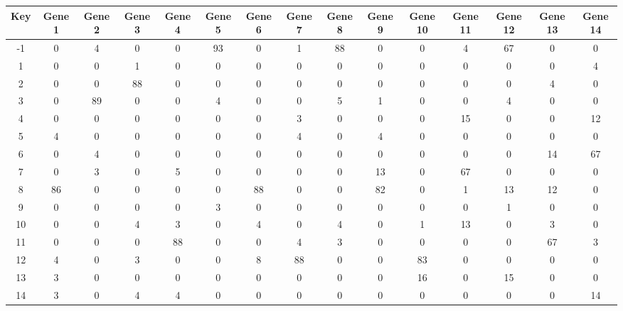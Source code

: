 \begin{tabular}{|c|c|c|c|c|c|c|c|c|c|c|c|c|c|c|}
\hline
Key & Gene 1 & Gene 2 & Gene 3 & Gene 4 & Gene 5 & Gene 6 & Gene 7 & Gene 8 & Gene 9 & Gene 10 & Gene 11 & Gene 12 & Gene 13 & Gene 14 \\
\hline
-1 & 0 & 4 & 0 & 0 & 93 & 0 & 1 & 88 & 0 & 0 & 4 & 67 & 0 & 0 \\
1 & 0 & 0 & 1 & 0 & 0 & 0 & 0 & 0 & 0 & 0 & 0 & 0 & 0 & 4 \\
2 & 0 & 0 & 88 & 0 & 0 & 0 & 0 & 0 & 0 & 0 & 0 & 0 & 4 & 0 \\
3 & 0 & 89 & 0 & 0 & 4 & 0 & 0 & 5 & 1 & 0 & 0 & 4 & 0 & 0 \\
4 & 0 & 0 & 0 & 0 & 0 & 0 & 3 & 0 & 0 & 0 & 15 & 0 & 0 & 12 \\
5 & 4 & 0 & 0 & 0 & 0 & 0 & 4 & 0 & 4 & 0 & 0 & 0 & 0 & 0 \\
6 & 0 & 4 & 0 & 0 & 0 & 0 & 0 & 0 & 0 & 0 & 0 & 0 & 14 & 67 \\
7 & 0 & 3 & 0 & 5 & 0 & 0 & 0 & 0 & 13 & 0 & 67 & 0 & 0 & 0 \\
8 & 86 & 0 & 0 & 0 & 0 & 88 & 0 & 0 & 82 & 0 & 1 & 13 & 12 & 0 \\
9 & 0 & 0 & 0 & 0 & 3 & 0 & 0 & 0 & 0 & 0 & 0 & 1 & 0 & 0 \\
10 & 0 & 0 & 4 & 3 & 0 & 4 & 0 & 4 & 0 & 1 & 13 & 0 & 3 & 0 \\
11 & 0 & 0 & 0 & 88 & 0 & 0 & 4 & 3 & 0 & 0 & 0 & 0 & 67 & 3 \\
12 & 4 & 0 & 3 & 0 & 0 & 8 & 88 & 0 & 0 & 83 & 0 & 0 & 0 & 0 \\
13 & 3 & 0 & 0 & 0 & 0 & 0 & 0 & 0 & 0 & 16 & 0 & 15 & 0 & 0 \\
14 & 3 & 0 & 4 & 4 & 0 & 0 & 0 & 0 & 0 & 0 & 0 & 0 & 0 & 14 \\
\hline
\end{tabular}